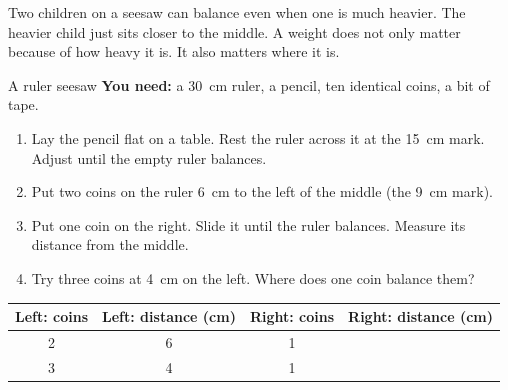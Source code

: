 \label{ch4}

Two children on a seesaw can balance even when one is much heavier. The heavier child just sits closer to the middle. A weight does not only matter because of how heavy it is. It also matters where it is.

\begin{center}
\end{center}

\begin{tryit}{A ruler seesaw}
\textbf{You need:} a 30~cm ruler, a pencil, ten identical coins, a bit of tape.
\begin{enumerate}[leftmargin=1.6em]
\item Lay the pencil flat on a table. Rest the ruler across it at the 15~cm mark. Adjust until the empty ruler balances.
\item Put two coins on the ruler 6~cm to the left of the middle (the 9~cm mark).
\item Put one coin on the right. Slide it until the ruler balances. Measure its distance from the middle.
\item Try three coins at 4~cm on the left. Where does one coin balance them?
\end{enumerate}
\par\medskip
\renewcommand{\arraystretch}{1.6}
\begin{tabular}{|c|c|c|c|}
\hline
\textbf{Left: coins} & \textbf{Left: distance (cm)} & \textbf{Right: coins} & \textbf{Right: distance (cm)}\\ \hline
2 & 6 & 1 & \\ \hline
3 & 4 & 1 & \\ \hline
\end{tabular}
\end{tryit}

